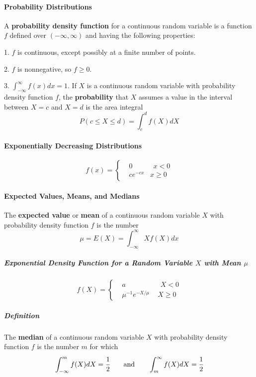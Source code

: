 \documentclass{article}
\begin{document}
            \paragraph{Probability Distributions}
                A \textbf{probability density function} for a continuous random variable is a function $f$ defined over $(-\infty,\infty)$ and having the following properties:
                \par 1. $f$ is continuous, except possibly at a finite number of points.
                \par 2. $f$ is nonnegative, so $f\ge 0$.
                \par 3. $\int_{-\infty}^\infty f(x)dx=1$.
                If $X$ is a continuous random variable with probability density function $f$, the \textbf{probability} that $X$ assumes a value in the interval between $X=c$ and $X=d$ is the area integral
                \[P(c\le X\le d)=\int_c^df(X)dX\]
            \paragraph{Exponentially Decreasing Distributions}
            \[f(x)=\left\{
                \begin{aligned}
                    &0\quad\qquad x<0\\
                    &ce^{-cx}\ \ \ \, x\ge 0
                \end{aligned}
            \right.\]
            \paragraph{Expected Values, Means, and Medians}
            The \textbf{expected value} or \textbf{mean} of a continuous random variable $X$ with probability density function $f$ is the number
            \[\mu=E(X)=\int_{-\infty}^\infty Xf(X)dx\]
                \subparagraph{Exponential Density Function for a Random Variable $X$ with Mean $\mu$}
                \[f(X)=\left\{
                    \begin{aligned}
                        &a\qquad\qquad\quad X<0\\
                        &\mu^{-1}e^{-X/\mu}\,\quad X\ge 0
                    \end{aligned}
                \right.\]
                \subparagraph{Definition} The \textbf{median} of a continuous random variable $X$ with probability density function $f$ is the number $m$ for which
                \[\int_{-\infty}^m f(X)dX=\cfrac{1}{2}\qquad\text{and}\qquad\int_m^\infty f(X)dX=\cfrac{1}{2}\]
\end{document}
